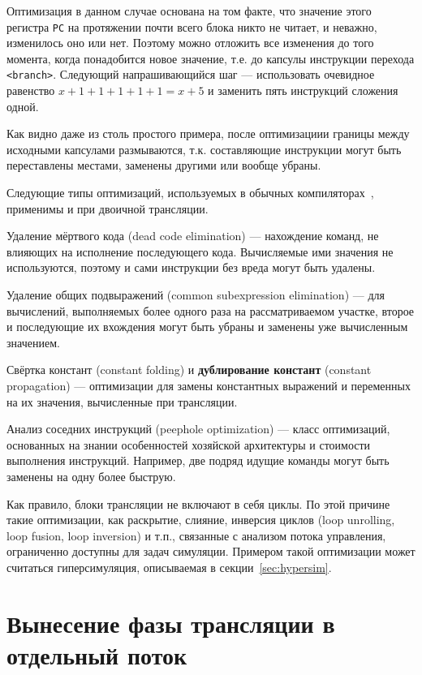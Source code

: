 Оптимизация в данном случае основана на том факте, что значение этого регистра \texttt{PC} на протяжении почти всего блока никто не читает, и неважно, изменилось оно или нет. Поэтому можно отложить все изменения до того  момента, когда понадобится новое значение, т.е. до капсулы  инструкции перехода \texttt{<branch>}. Следующий напрашивающийся шаг --- использовать очевидное равенство $x+1+1+1+1+1 = x +5$ и заменить пять инструкций сложения одной.

Как видно даже из столь простого примера, после оптимизациии границы между исходными капсулами размываются, т.к. составляющие инструкции могут быть переставлены местами, заменены другими или вообще убраны. 

Следующие типы оптимизаций, используемых в обычных компиляторах~\cite{dragonbook}, применимы и при двоичной трансляции.

\begin{description*}
\item[Удаление мёртвого кода] (\abbr dead code elimination) --- нахождение команд, не влияющих на исполнение последующего кода. Вычисляемые ими значения не используются, поэтому и сами инструкции без вреда могут быть удалены.
\item[Удаление общих подвыражений] (\abbr common subexpression elimination) ---  для вычислений, выполняемых более одного раза на рассматриваемом участке, второе и последующие их вхождения могут быть убраны и заменены уже вычисленным значением.
\item[Свёртка констант] (\abbr constant folding) и \textbf{дублирование констант} (\abbr constant propagation) --- оптимизации для замены константных выражений и переменных на их значения, вычисленные при трансляции.
\item[Анализ соседних инструкций] (\abbr peephole optimization) --- класс оптимизаций, основанных на знании особенностей хозяйской архитектуры и стоимости выполнения инструкций. Например, две подряд идущие команды могут быть заменены на одну более быструю.
\end{description*}

Как правило, блоки трансляции не включают в себя циклы. По этой причине такие оптимизации, как раскрытие, слияние, инверсия циклов (\abbr loop unrolling, loop fusion, loop inversion) и т.п., связанные с анализом потока управления, ограниченно доступны для задач симуляции. Примером такой оптимизации может считаться гиперсимуляция, описываемая в секции~\ref{sec:hypersim}.

\section{Вынесение фазы трансляции в отдельный поток}\label{sec:parallel-bt}

